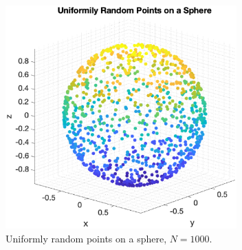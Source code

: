 \begin{figure}[H]
\centering
\includegraphics[width=3.5in]{Utilities/Figures/uniformrand}
\caption{Uniformly random points on a sphere, $N = 1000$. }
\end{figure}

{\footnotesize
{}
}

%
%
%
%
%
%
%
%
%

%

